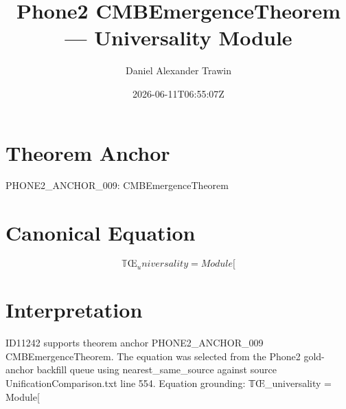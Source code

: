 \documentclass[11pt]{article}
\title{Phone2 CMBEmergenceTheorem — Universality Module}
\author{Daniel Alexander Trawin}
\date{2026-06-11T06:55:07Z}
\begin{document}
\maketitle
\section*{Theorem Anchor}
PHONE2_ANCHOR_009: CMBEmergenceTheorem
\section*{Canonical Equation}
\[
𝕋Œ_universality = Module[
\]
\section*{Interpretation}
ID11242 supports theorem anchor PHONE2_ANCHOR_009 CMBEmergenceTheorem. The equation was selected from the Phone2 gold-anchor backfill queue using nearest_same_source against source UnificationComparison.txt line 554. Equation grounding: 𝕋Œ_universality = Module[
\end{document}
